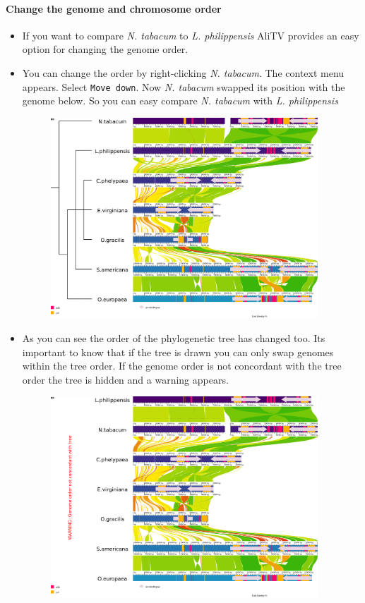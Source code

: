 \documentclass[a4paper]{scrartcl}
\begin{document}
\paragraph*{Change the genome and chromosome order}	
\begin{itemize}
\item If you want to compare \emph{N. tabacum} to \emph{L. philippensis} AliTV provides an easy option for changing the genome order.
\item You can change the order by right-clicking \emph{N. tabacum}. The context menu appears. Select \texttt{Move down}. Now \emph{N. tabacum} swapped its position with the genome below. So you can easy compare \emph{N. tabacum} with \emph{L. philippensis}

	\begin{figure}
		\centering
		\includegraphics[width=10cm]{swap1.png}
		\caption{}
	\end{figure}
	
	\item As you can see the order of the phylogenetic tree has changed too. Its important to know that if the tree is drawn you can only swap genomes within the tree order. If the genome order is not concordant with the tree order the tree is hidden and a warning appears.
	
	\begin{figure}
		\centering
		\includegraphics[width=10cm]{warn.png}
		\caption{}
	\end{figure}
	 

\end{itemize}
\end{document}
